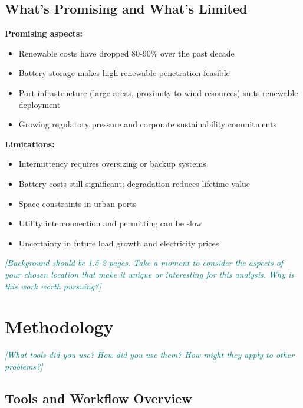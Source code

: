 \documentclass[11pt,letterpaper]{article}
\newcommand{\hint}[1]{\textcolor{teal}{\small\textit{[#1]}}}
\begin{document}
\subsection{What's Promising and What's Limited}

\textbf{Promising aspects:}
\begin{itemize}
    \item Renewable costs have dropped 80-90\% over the past decade
    \item Battery storage makes high renewable penetration feasible
    \item Port infrastructure (large areas, proximity to wind resources) suits renewable deployment
    \item Growing regulatory pressure and corporate sustainability commitments
\end{itemize}

\textbf{Limitations:}
\begin{itemize}
    \item Intermittency requires oversizing or backup systems
    \item Battery costs still significant; degradation reduces lifetime value
    \item Space constraints in urban ports
    \item Utility interconnection and permitting can be slow
    \item Uncertainty in future load growth and electricity prices
\end{itemize}

\hint{Background should be 1.5-2 pages. Take a moment to consider the aspects of your chosen location that make it unique or interesting for this analysis. Why is this work worth pursuing?}

\section{Methodology}

\hint{What tools did you use? How did you use them? How might they apply to other problems?}

\subsection{Tools and Workflow Overview}
\end{document}
